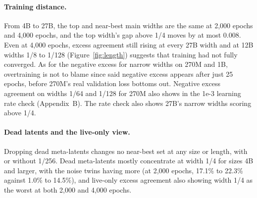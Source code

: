 \paragraph{Training distance.}
From 4B to 27B, the top and near-best main widths are the same at 2,000 epochs and 4,000 epochs, and the top width's gap above 1/4 moves by at most 0.008.
Even at 4,000 epochs, excess agreement still rising at every 27B width and at 12B widths 1/8 to 1/128 (Figure~\ref{fig:length}) suggests that training had not fully converged.
As for the negative excess for narrow widths on 270M and 1B, overtraining is not to blame since said negative excess appears after just 25 epochs, before 270M's real validation loss bottoms out.
Negative excess agreement on widths 1/64 and 1/128 for 270M also shows in the 1e-3 learning rate check (Appendix~B).
The rate check also shows 27B's narrow widths scoring above 1/4.

\paragraph{Dead latents and the live-only view.}
Dropping dead meta-latents changes no near-best set at any size or length, with or without 1/256.
Dead meta-latents mostly concentrate at width 1/4 for sizes 4B and larger, with the noise twins having more (at 2,000 epochs, 17.1\% to 22.3\% against 1.0\% to 14.5\%), and live-only excess agreement also showing width 1/4 as the worst at both 2,000 and 4,000 epochs.

